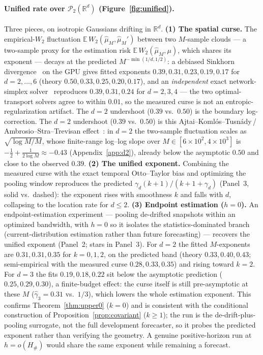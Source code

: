\documentclass[11pt]{article}
\theoremstyle{definition}
\theoremstyle{remark}
\newcommand{\R}{\mathbb{R}}
\newcommand{\E}{\mathbb{E}}
\newcommand{\PP}{\mathcal{P}_2(\R^d)}
\begin{document}
\paragraph{Unified rate over $\PP$ (Figure~\ref{fig:unified}).} Three pieces, on isotropic
Gaussians drifting in $\R^d$. \textbf{(1) The spatial curse.} The empirical-$W_2$ fluctuation
$\E\,W_2(\hat\mu_M,\hat\mu_M')$ between two $M$-sample clouds --- a two-sample proxy for the
estimation risk $\E\,W_2(\hat\mu_M,\mu)$, which shares its exponent --- decays at the predicted
$M^{-\min(1/d,1/2)}$: a debiased Sinkhorn divergence~\cite{cuturi,feydy} on the GPU gives fitted exponents
$0.39,0.31,0.23,0.19,0.17$ for $d=2,\dots,6$ (theory $0.50,0.33,0.25,0.20,0.17$), and an
\emph{independent} exact network-simplex solver~\cite{peyrecuturi} reproduces $0.39,0.31,0.24$
for $d=2,3,4$ --- the two optimal-transport solvers agree to within $0.01$, so the measured curse
is not an entropic-regularization artifact. The $d=2$ undershoot ($0.39$ vs.\ $0.50$) is the
boundary log-correction. The $d=2$ undershoot ($0.39$ vs.\ $0.50$) is this
Ajtai--Koml\'os--Tusn\'ady\,/\,Ambrosio--Stra--Trevisan effect~\cite{ast}: in $d=2$ the two-sample
fluctuation scales as $\sqrt{\log M/M}$, whose finite-range log--log slope over
$M\in[6\times10^2,4\times10^3]$ is $-\tfrac12+\tfrac{1}{2\log M}\approx-0.43$ (Appendix~\ref{app:d2}),
already below the asymptotic $0.50$ and close to the observed $0.39$. \textbf{(2) The unified exponent.} Combining the measured
curse with the exact temporal Otto--Taylor bias and optimizing the pooling window reproduces the
predicted $\gamma_d(k+1)/(k+1+\gamma_d)$ (Panel~3, solid vs.\ dashed): the exponent rises with
smoothness $k$ and falls with $d$, collapsing to the location rate for $d\le2$. \textbf{(3)
Endpoint estimation ($h=0$).} An endpoint-estimation experiment --- pooling de-drifted snapshots
within an optimized bandwidth, with $h=0$ so it isolates the statistics-dominated branch
(current-distribution estimation rather than future forecasting) --- recovers the unified exponent
(Panel~2; stars in Panel~3). For $d=2$ the fitted $M$-exponents are $0.31,0.31,0.35$ for $k=0,1,2$, on the
predicted band (theory $0.33,0.40,0.43$; semi-empirical with the measured curse $0.28,0.33,0.35$)
and rising toward $k{=}2$. For $d=3$ the fits $0.19,0.18,0.22$ sit below the asymptotic prediction
($0.25,0.29,0.30$), a finite-budget effect: the curse itself is still pre-asymptotic at these $M$
($\hat\gamma_3=0.31$ vs.\ $1/3$), which lowers the whole estimation exponent. This confirms
Theorem~\ref{thm:upper0} ($k{=}0$) and is consistent with the conditional construction of
Proposition~\ref{prop:covariant} ($k\ge1$); the run is the de-drift-plus-pooling surrogate, not the
full development forecaster, so it probes the predicted exponent rather than verifying the
geometry. A genuine
positive-horizon run at $h=o(H_\#)$ would share the same exponent while remaining a forecast.
\end{document}
